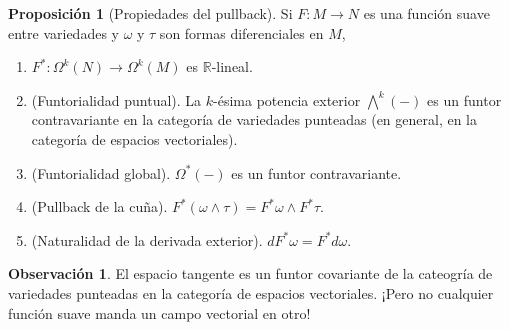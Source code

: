 \documentclass[spanish]{article}
\theoremstyle{definition}
\newtheorem*{prop}{Proposición}
\newtheorem*{obs}{Observación}
\newcommand{\R}{\mathbb{R}}
\newcommand{\Cinf}{C^\infty}
\DeclareMathOperator{\Id}{Id}
\begin{document}
\begin{enumerate}
		\begin{prop}[Propiedades del pullback]
			Si $F:M\to N$ es una función suave entre variedades y $\omega$ y $\tau$ son formas diferenciales en $M$,
			\begin{enumerate}
				\item $F^*:\Omega^k(N)\to\Omega^k(M)$ es $\R$-lineal.
				\item (Funtorialidad puntual). La $k$-ésima potencia exterior $\bigwedge^k(-)$ es un funtor contravariante en la categoría de variedades punteadas (en general, en la categoría de espacios vectoriales). 
				
				\item (Funtorialidad global). $\Omega^*(-)$ es un funtor contravariante.
				\item (Pullback de la cuña). $F^*(\omega\wedge\tau)=F^*\omega\wedge F^*\tau$.
			\item (Naturalidad de la derivada exterior).
			$dF^*\omega=F^*d\omega$.
		\end{enumerate}
		\end{prop}
		\begin{obs}
			El espacio tangente es un funtor covariante de la cateogría de variedades punteadas en la categoría de espacios vectoriales. ¡Pero no cualquier función suave manda un campo vectorial en otro!
		\end{obs}
		
		
		
	\end{enumerate}
	\iffalse
	\begin{obs}[Tres formas de ver la derivada de una función real-valuada]
		Sea $f\in\Cinf(M)$. Los siguientes tres objetos están en correspondencia:
		\begin{enumerate}
			\item La diferencial $f_{*,p}:T_pM\to T_{f(p)}\R$ que manda $v$ al vector $f_{*,p}v$ dado por $\Cinf(\R)\ni g\mapsto v(g\circ f)$.
			\item La 1-forma $df\in \Omega^1(M)$ obtenida mediante la derivada exterior de $f$, definida por $df(v)=vf$, evaluada en $p$.
			\item La función que a una curva $\gamma:(-\varepsilon,\varepsilon)\to M$ con $\gamma(0)=p$ y $\gamma'(0)=v$ le asocia el número real $(f\circ \gamma)'(0)$.
		\end{enumerate}
	\end{obs}
	\fi
	
\end{document}
